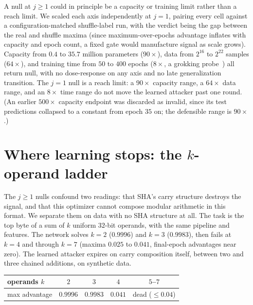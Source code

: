 \documentclass[11pt]{article}
\begin{document}
A null at $j\ge1$ could in principle be a capacity or training limit rather
than a reach limit. We scaled each axis independently at $j=1$, pairing
every cell against a configuration-matched shuffle-label run, with the
verdict being the gap between the real and shuffle maxima (since
maximum-over-epochs advantage inflates with capacity and epoch count, a
fixed gate would manufacture signal as scale grows). Capacity from $0.4$ to
$35.7$ million parameters ($90\times$), data from $2^{16}$ to $2^{22}$
samples ($64\times$), and training time from $50$ to $400$ epochs
($8\times$, a grokking probe~\cite{grokking}) all return null, with no
dose-response on any axis and no late generalization transition. The $j=1$
null is a reach limit: a $90\times$ capacity range, a $64\times$ data
range, and an $8\times$ time range do not move the learned attacker past
one round. (An earlier $500\times$ capacity endpoint was discarded as
invalid, since its test predictions collapsed to a constant from epoch $35$
on; the defensible range is $90\times$.)

\section{Where learning stops: the $k$-operand ladder}\label{sec:ladder}

The $j\ge1$ nulls confound two readings: that SHA's carry structure
destroys the signal, and that this optimizer cannot compose modular
arithmetic in this format. We separate them on data with no SHA structure
at all. The task is the top byte of a sum of $k$ uniform $32$-bit operands,
with the same pipeline and features. The network solves $k=2$ ($0.9996$)
and $k=3$ ($0.9983$), then fails at $k=4$ and through $k=7$ (maxima
$0.025$ to $0.041$, final-epoch advantages near zero). The learned attacker
expires on carry composition itself, between two and three chained
additions, on synthetic data.

\begin{center}
\begin{tabular}{lcccc}
\hline
operands $k$ & $2$ & $3$ & $4$ & $5$--$7$\\
\hline
max advantage & $0.9996$ & $0.9983$ & $0.041$ & dead ($\le 0.04$)\\
\hline
\end{tabular}
\end{center}
\end{document}
